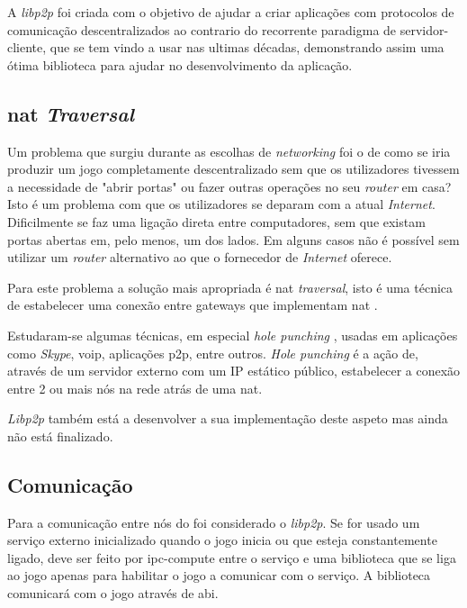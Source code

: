 A \textit{libp2p} foi criada com o objetivo de ajudar a criar aplicações com protocolos de comunicação descentralizados ao contrario do recorrente paradigma de servidor-cliente, que se tem vindo a usar nas ultimas décadas, demonstrando assim uma ótima biblioteca para ajudar no desenvolvimento da aplicação.

\subsection{\acrfull{nat}  \textit{Traversal}}

Um problema que surgiu durante as escolhas de  \textit{networking} foi o de como se iria produzir um jogo completamente descentralizado sem que os utilizadores tivessem a necessidade de "abrir portas" ou fazer outras operações no seu \textit{router} em casa? Isto é um problema com que os utilizadores se deparam com a atual  \textit{Internet}. Dificilmente se faz uma ligação direta entre computadores, sem que existam portas abertas em, pelo menos, um dos lados. Em alguns casos não é possível sem utilizar um \textit{router} alternativo ao que o fornecedor de \textit{Internet} oferece.

Para este problema a solução mais apropriada é \acrshort{nat} \textit{traversal}, isto é uma técnica de estabelecer uma conexão entre \glspl{gateway} que implementam \acrshort{nat} \cite{natt_wiki}.


Estudaram-se algumas técnicas, em especial \textit{hole punching}  \cite{hp_wiki}, usadas em aplicações como \textit{Skype}, \acrfull{voip}, aplicações \acrfull{p2p}, entre outros. \textit{Hole punching} é a ação de, através de um servidor externo com um IP estático público, estabelecer a conexão entre 2 ou mais nós na rede atrás de uma \acrshort{nat}.  \cite{hole_punching}

\textit{Libp2p} também está a desenvolver a sua implementação deste aspeto mas ainda não está finalizado. \cite{natt_lip2p_status}


\subsection{Comunicação}

Para a comunicação entre nós do \gamechaining{} foi considerado o \textit{libp2p}.
Se for usado um serviço externo inicializado quando o jogo inicia ou que esteja constantemente ligado, deve ser feito por \acrfull{ipc-compute} entre o serviço e uma biblioteca que se liga ao jogo apenas para habilitar o jogo a comunicar com o serviço. A biblioteca comunicará com o jogo através de \acrfull{abi}.

